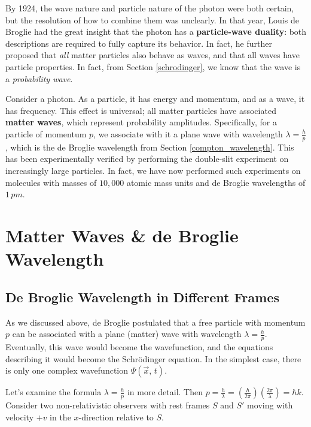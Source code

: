 By 1924, the wave nature and particle nature of the photon were both certain, but the resolution of how to combine them was unclearly. In that year, Louis de Broglie had the great insight that the photon has a \textbf{particle-wave duality}: both descriptions are required to fully capture its behavior. In fact, he further proposed that \textit{all} matter particles also behave as waves, and that all waves have particle properties. In fact, from Section \ref{schrodinger}, we know that the wave is a \textit{probability wave}. 

Consider a photon. As a particle, it has energy and momentum, and as a wave, it has frequency. This effect is universal; all matter particles have associated \textbf{matter waves}, which represent probability amplitudes. Specifically, for a particle of momentum $p$, we associate with it a plane wave with wavelength $\lambda=\frac{h}{p}$, which is the de Broglie wavelength from Section \ref{compton_wavelength}. This has been experimentally verified by performing the double-slit experiment on increasingly large particles. In fact, we have now performed such experiments on molecules with masses of $10,000$ atomic mass units and de Broglie wavelengths of $1\,pm$. 

\section{Matter Waves \& de Broglie Wavelength}
\label{matter_waves_deBroglie_wavelength}

\subsection{De Broglie Wavelength in Different Frames}
\label{debroglie_in_different_frames}

As we discussed above, de Broglie postulated that a free particle with momentum $p$ can be associated with a plane (matter) wave with wavelength $\lambda=\frac{h}{p}$. Eventually, this wave would become the wavefunction, and the equations describing it would become the Schrödinger equation. In the simplest case, there is only one complex wavefunction $\Psi(\vec{x},\,t)$.

Let's examine the formula $\lambda=\frac{h}{p}$ in more detail. Then $p=\frac{h}{\lambda}=(\frac{h}{2\pi})(\frac{2\pi}{\lambda})=\hbar k$. Consider two non-relativistic observers with rest frames $S$ and $S'$ moving with velocity $+v$ in the $x$-direction relative to $S$. 

